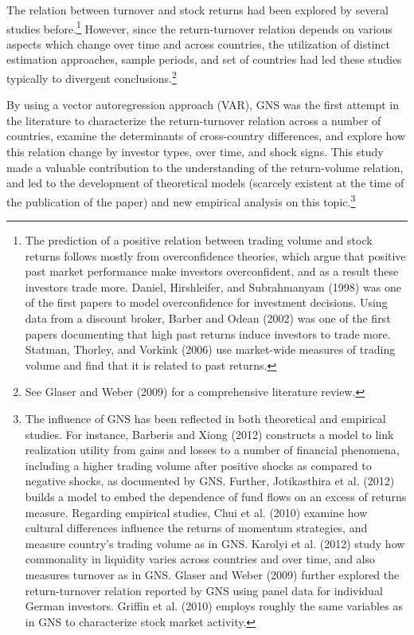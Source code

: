 \documentclass[final,3p,times,twocolumn]{elsarticle}
\begin{document}
The relation between turnover and stock returns had been explored by several studies before.\footnote{The prediction of a positive relation between trading volume and stock returns follows mostly from overconfidence theories, which argue that positive past market performance make investors overconfident, and as a result these
investors trade more. Daniel, Hirshleifer, and Subrahmanyam (1998) was one of the first papers to model overconfidence for investment decisions. Using data from a discount broker, Barber and Odean (2002) was one of the first papers documenting that high past returns induce investors to trade more. Statman, Thorley, and Vorkink (2006) use market-wide measures of trading volume and find that it is related to past returns.} However, since the return-turnover relation depends on various aspects which change over time and across countries, the utilization of distinct estimation approaches, sample periods, and set of countries had led these studies typically to divergent conclusions.\footnote{See Glaser and Weber (2009) for a comprehensive literature review.}\par

By using a vector autoregression approach (VAR), GNS was the first attempt in the literature to characterize the return-turnover relation across a number of countries, examine the determinants of cross-country differences, and explore how this relation change by investor types, over time, and shock signs. This study made a valuable contribution to the understanding of the return-volume relation, and led to the development of theoretical models (scarcely existent at the time of the publication of the paper) and new empirical analysis on this topic.\footnote{The influence of GNS has been reflected in both theoretical and empirical studies. For instance, Barberis and Xiong (2012) constructs a model to link realization utility from gains and losses to a number of financial phenomena, including a higher trading volume after positive shocks as compared to negative shocks, as documented by GNS. Further, Jotikasthira et al. (2012) builds a model to embed the dependence of fund flows on an excess of returns measure. Regarding empirical studies, Chui et al. (2010) examine how cultural differences influence the returns of momentum strategies, and measure country's trading volume as in GNS. Karolyi et al. (2012) study how commonality in liquidity varies across countries and over time, and also measures turnover as in GNS. Glaser and Weber (2009) further explored the return-turnover relation reported by GNS using panel data for individual German investors. Griffin et al. (2010) employs roughly the same variables as in GNS to characterize stock market activity.} \par
\end{document}
